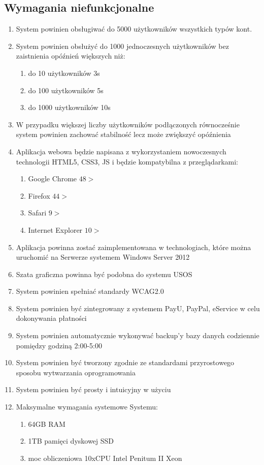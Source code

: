 \documentclass{article}
\begin{document}
\subsection{Wymagania niefunkcjonalne}
\begin{enumerate}
	\item System powinien obsługiwać do 5000 użytkowników wszystkich typów kont.
	\item System powinien obsłużyć do 1000 jednoczesnych użytkowników bez zaistnienia opóźnień większych niż:
	\begin{enumerate}
		\item 	do 10 użytkowników 3s
		\item do 100 użytkowników 5s
		\item do 1000 użytkowników 10s
	\end{enumerate}
	\item W przypadku większej liczby użytkowników podłączonych równocześnie system powinien zachować stabilność lecz może zwiększyć opóźnienia
	\item Aplikacja webowa będzie napisana z wykorzystaniem nowoczesnych technologii HTML5, CSS3, JS i będzie kompatybilna z przeglądarkami:
	\begin{enumerate}
		\item Google Chrome $48>$
		\item Firefox $44>$
		\item Safari $9>$
		\item Internet Explorer $10>$
	\end{enumerate}
	\item Aplikacja powinna zostać zaimplementowana w technologiach, które można uruchomić na Serwerze systemem Windows Server 2012
	\item Szata graficzna powinna być podobna do systemu USOS
	\item System powinien spełniać standardy WCAG2.0
	\item System powinien być zintegrowany z systemem PayU, PayPal, eService w celu dokonywania płatności
	\item System powinien automatycznie wykonywać backup’y bazy danych codziennie pomiędzy godziną 2:00-5:00
	\item System powinien być tworzony zgodnie ze standardami przyrostowego sposobu  wytwarzania oprogramowania
	\item System powinien być prosty i intuicyjny w użyciu
	\item Maksymalne wymagania systemowe Systemu:
	\begin{enumerate}
		\item 64GB RAM
		\item 1TB pamięci dyskowej SSD
		\item moc obliczeniowa 10xCPU Intel Penitum II Xeon
	\end{enumerate}

	
\end{enumerate}
\end{document}

